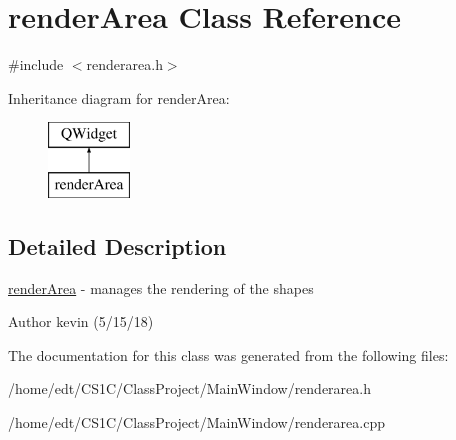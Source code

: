 \hypertarget{classrenderArea}{\section{render\-Area Class Reference}
\label{classrenderArea}
}


{\ttfamily \#include $<$renderarea.\-h$>$}

Inheritance diagram for render\-Area\-:\begin{figure}[H]
\begin{center}
\leavevmode
\includegraphics[height=2.000000cm]{classrenderArea}
\end{center}
\end{figure}


\subsection{Detailed Description}
\hyperlink{classrenderArea}{render\-Area} -\/ manages the rendering of the shapes

\begin{DoxyAuthor}{Author}
kevin (5/15/18) 
\end{DoxyAuthor}


The documentation for this class was generated from the following files\-:\begin{DoxyCompactItemize}
\item 
/home/edt/\-C\-S1\-C/\-Class\-Project/\-Main\-Window/renderarea.\-h\item 
/home/edt/\-C\-S1\-C/\-Class\-Project/\-Main\-Window/renderarea.\-cpp\end{DoxyCompactItemize}
